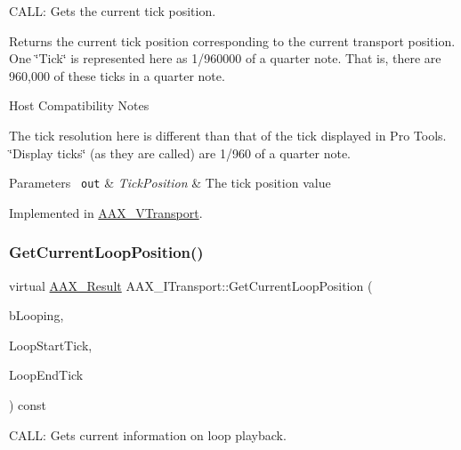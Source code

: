 C\+A\+LL\+: Gets the current tick position. 

Returns the current tick position corresponding to the current transport position. One \char`\"{}\+Tick\char`\"{} is represented here as 1/960000 of a quarter note. That is, there are 960,000 of these ticks in a quarter note.

\begin{DoxyRefDesc}{Host Compatibility Notes}
\item[\mbox{\hyperlink{a00786__compatibility_notes000060}{Host Compatibility Notes}}]The tick resolution here is different than that of the tick displayed in Pro Tools. \char`\"{}\+Display ticks\char`\"{} (as they are called) are 1/960 of a quarter note.\end{DoxyRefDesc}



\begin{DoxyParams}[1]{Parameters}
\mbox{\texttt{ out}}  & {\em Tick\+Position} & The tick position value \\
\hline
\end{DoxyParams}


Implemented in \mbox{\hyperlink{a01941_a1e46d5b0d2c1809ca4bd185703e64091}{A\+A\+X\+\_\+\+V\+Transport}}.

\mbox{\label{a01885_a386bade7d8902130a02c6e6dc8b2123b}} 
\subsubsection{\texorpdfstring{GetCurrentLoopPosition()}{GetCurrentLoopPosition()}}
{\footnotesize\ttfamily virtual \mbox{\hyperlink{a00392_a4d8f69a697df7f70c3a8e9b8ee130d2f}{A\+A\+X\+\_\+\+Result}} A\+A\+X\+\_\+\+I\+Transport\+::\+Get\+Current\+Loop\+Position (\begin{DoxyParamCaption}\item[{bool $\ast$}]{b\+Looping,  }\item[{int64\+\_\+t $\ast$}]{Loop\+Start\+Tick,  }\item[{int64\+\_\+t $\ast$}]{Loop\+End\+Tick }\end{DoxyParamCaption}) const\hspace{0.3cm}{\ttfamily [pure virtual]}}



C\+A\+LL\+: Gets current information on loop playback. 

